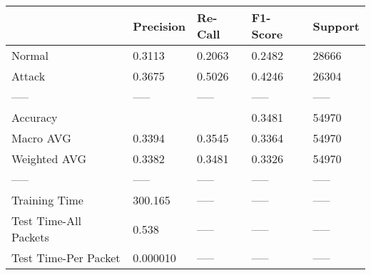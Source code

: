 \begin{tabular}{lllll}
\toprule
{} & Precision & Re-Call & F1-Score & Support \\
\midrule
Normal                &    0.3113 &  0.2063 &   0.2482 &   28666 \\
Attack                &    0.3675 &  0.5026 &   0.4246 &   26304 \\
-----                 &     ----- &   ----- &    ----- &   ----- \\
Accuracy              &           &         &   0.3481 &   54970 \\
Macro AVG             &    0.3394 &  0.3545 &   0.3364 &   54970 \\
Weighted AVG          &    0.3382 &  0.3481 &   0.3326 &   54970 \\
-----                 &     ----- &   ----- &    ----- &   ----- \\
Training Time         &   300.165 &   ----- &    ----- &   ----- \\
Test Time-All Packets &     0.538 &   ----- &    ----- &   ----- \\
Test Time-Per Packet  &  0.000010 &   ----- &    ----- &   ----- \\
\bottomrule
\end{tabular}
